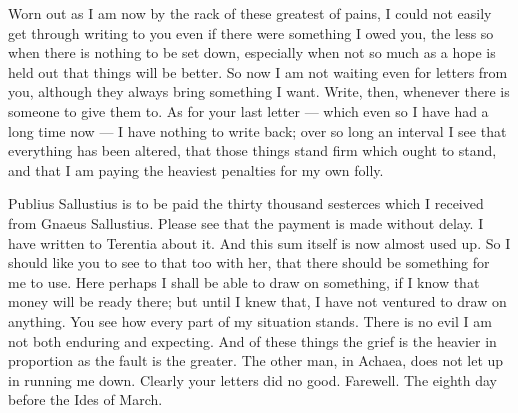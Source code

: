 

 Worn out as I am now by the rack of these greatest of pains, I could not easily get through writing to you even if there were something I owed you, the less so when there is nothing to be set down, especially when not so much as a hope is held out that things will be better. So now I am not waiting even for letters from you, although they always bring something I want. Write, then, whenever there is someone to give them to. As for your last letter --- which even so I have had a long time now --- I have nothing to write back; over so long an interval I see that everything has been altered, that those things stand firm which ought to stand, and that I am paying the heaviest penalties for my own folly.

 Publius Sallustius is to be paid the thirty thousand sesterces which I received from Gnaeus Sallustius. Please see that the payment is made without delay. I have written to Terentia about it. And this sum itself is now almost used up. So I should like you to see to that too with her, that there should be something for me to use. Here perhaps I shall be able to draw on something, if I know that money will be ready there; but until I knew that, I have not ventured to draw on anything. You see how every part of my situation stands. There is no evil I am not both enduring and expecting. And of these things the grief is the heavier in proportion as the fault is the greater. The other man, in Achaea, does not let up in running me down. Clearly your letters did no good. Farewell. The eighth day before the Ides of March.
